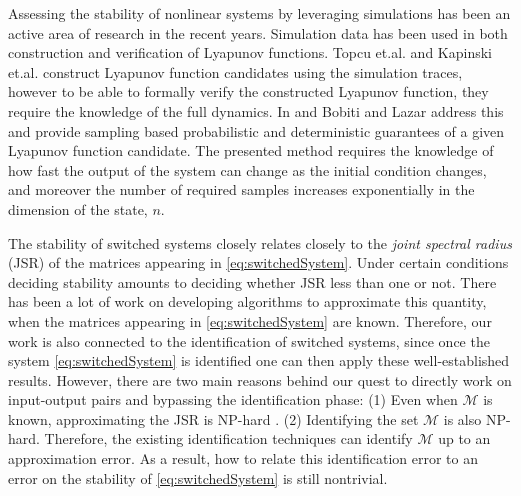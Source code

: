 \documentclass[letterpaper, 10 pt, conference]{ieeeconf}  %
\newcommand{\re}{\mathbb{R}}
\newcommand{\calM}{\mathcal{M}}
\newenvironment{definition}[1][Definition]{\begin{trivlist}
\item[\hskip \labelsep {\bfseries #1}]}{\end{trivlist}}
\begin{document}
Assessing the stability of nonlinear systems by leveraging simulations has been an active area of research in the recent years. Simulation data has been used in both construction and verification of Lyapunov functions. Topcu et.al. \cite{topcu} and Kapinski et.al. \cite{kapinski} construct Lyapunov function candidates using the simulation traces, however to be able to formally verify the constructed Lyapunov function, they require the knowledge of the full dynamics. In \cite{lazar} and \cite{lazar2} Bobiti and Lazar address this and provide sampling based probabilistic and deterministic guarantees of a given Lyapunov function candidate. The presented method requires the knowledge of how fast the output of the system can change as the initial condition changes, and moreover the number of required samples increases exponentially in the dimension of the state, $n$.

The stability of switched systems closely relates closely to the \emph{joint spectral radius} (JSR) of the matrices appearing in \eqref{eq:switchedSystem}. Under certain conditions deciding stability amounts to deciding whether JSR less than one or not. There has been a lot of work on developing algorithms to approximate this quantity, when the matrices appearing in \eqref{eq:switchedSystem} are known. Therefore, our work is also connected to the identification of switched systems, since once the system \eqref{eq:switchedSystem} is identified one can then apply these well-established results. However, there are two main reasons behind our quest to directly work on input-output pairs and bypassing the identification phase: (1) Even when $\calM$ is known, approximating the JSR is NP-hard \cite{jungers}. (2) Identifying the set $\calM$ is also NP-hard. Therefore, the existing identification techniques can identify $\calM$ up to an approximation error. As a result, how to relate this identification error to an error on the stability of \eqref{eq:switchedSystem} is still nontrivial.
\end{document}
